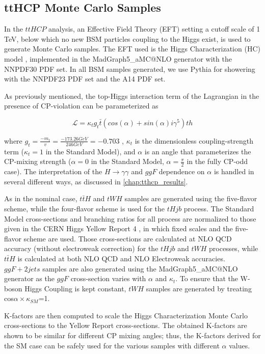 \subsection{ttHCP Monte Carlo Samples} \label{sec:ttHCPMC} 

In the $ttH CP$ analysis, an Effective Field Theory (EFT) setting a cutoff scale of 1 TeV, below which no new BSM particles coupling to the Higgs exist, is used to generate Monte Carlo samples. The EFT used is the Higgs Characterization (HC) model \cite{HC}, implemented in the {MadGraph5\_aMC@NLO} generator with the NNPDF30 PDF set. In all BSM samples generated, we use Pythia for showering with the NNPDF23 PDF set and the A14 PDF set.

As previously mentioned, the top-Higgs interaction term of the Lagrangian in the presence of CP-violation can be parameterized as

\begin{equation}
\mathcal{L} = \kappa_{t} g_{t} \bar{t} (cos(\alpha)+ sin(\alpha) i \gamma^{5} )th
\end{equation}

where $g_{t} = \frac{-m_{t}}{v} = \frac{-173.26 GeV}{246 GeV} = -0.703$ , $\kappa_{t}$ is the dimensionless coupling-strength term ($\kappa_{t}= 1$ in the Standard Model), and $\alpha$ is an angle that parameterizes the CP-mixing strength ($\alpha = 0$ in the Standard Model, $\alpha = \frac{\pi}{2}$ in the fully CP-odd case). The interpretation of the $H \rightarrow \gamma \gamma$ and $ggF$ dependence on $\alpha$ is handled in several different ways, as discussed in \ref{chap:tthcp_results}.

As in the nominal case, $t\bar{t}H$ and $tWH$ samples are generated using the five-flavor scheme, while the four-flavor scheme is used for the $tHjb$ process. The Standard Model cross-sections and branching ratios for all process are normalized to those given in the CERN Higgs Yellow Report 4 \cite{YellowReport4}, in which fixed scales and the five-flavor scheme are used. Those cross-sections are calculated at NLO QCD accuracy (without electroweak correction) for the $tHjb$ and $tWH$ processes, while $t\bar{t}H$ is calculated at both NLO QCD and NLO Electroweak accuracies. $ggF+ 2 jets$ samples are also generated using the {MadGraph5\_aMC@NLO} generator as the $ggF$ cross-section varies with $\alpha$ and $\kappa_{t}$. To ensure that the W-boson Higgs Coupling is kept constant, $tWH$ samples are generated by treating cos$\alpha \times \kappa_{SM}$=1.


K-factors are then computed to scale the Higgs Characterization Monte Carlo cross-sections to the Yellow Report cross-sections. The obtained K-factors are shown to be similar for different CP mixing angles; thus, the K-factors derived for the SM case can be safely used for the various samples with different $\alpha$ values. 

